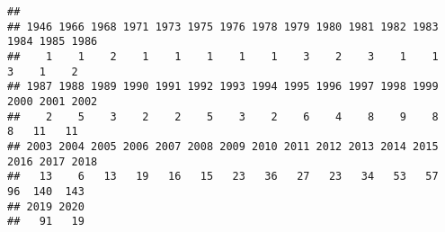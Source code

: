\documentclass[
]{article}
\newenvironment{Shaded}{\begin{snugshade}}{\end{snugshade}}
\newcommand{\FunctionTok}[1]{\textcolor[rgb]{0.00,0.00,0.00}{#1}}
\newcommand{\NormalTok}[1]{#1}
\newcommand{\SpecialCharTok}[1]{\textcolor[rgb]{0.00,0.00,0.00}{#1}}
\begin{document}
\begin{verbatim}
## 
## 1946 1966 1968 1971 1973 1975 1976 1978 1979 1980 1981 1982 1983 1984 1985 1986 
##    1    1    2    1    1    1    1    1    3    2    3    1    1    3    1    2 
## 1987 1988 1989 1990 1991 1992 1993 1994 1995 1996 1997 1998 1999 2000 2001 2002 
##    2    5    3    2    2    5    3    2    6    4    8    9    8    8   11   11 
## 2003 2004 2005 2006 2007 2008 2009 2010 2011 2012 2013 2014 2015 2016 2017 2018 
##   13    6   13   19   16   15   23   36   27   23   34   53   57   96  140  143 
## 2019 2020 
##   91   19
\end{verbatim}

\begin{Shaded}
\end{Shaded}
\end{document}
